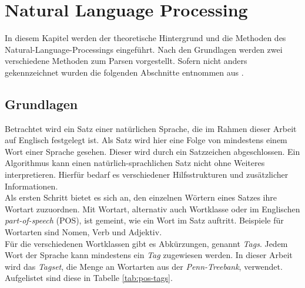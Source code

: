 %
\chapter{Natural Language Processing}
\label{sec:nlp}
In diesem Kapitel werden der theoretische Hintergrund und die Methoden des Natural-Language-Processings eingeführt. Nach den Grundlagen werden zwei verschiedene Methoden zum Parsen vorgestellt. Sofern nicht anders gekennzeichnet wurden die folgenden Abschnitte entnommen aus \cite{nlpGrundlagen}.

\section{Grundlagen}
\label{sec:nlp:grundlagen}

Betrachtet wird ein Satz einer natürlichen Sprache, die im Rahmen dieser Arbeit auf Englisch festgelegt ist. Als Satz wird hier eine Folge von mindestens einem Wort einer Sprache gesehen. Dieser wird durch ein Satzzeichen abgeschlossen.
Ein Algorithmus kann einen natürlich-sprachlichen Satz nicht ohne Weiteres interpretieren. Hierfür bedarf es verschiedener Hilfsstrukturen und zusätzlicher Informationen.\\
Als ersten Schritt bietet es sich an, den einzelnen Wörtern eines Satzes ihre Wortart zuzuordnen. Mit Wortart, alternativ auch Wortklasse oder im Englischen \textit{part-of-speech} (POS), ist gemeint, wie ein Wort im Satz auftritt. Beispiele für Wortarten sind Nomen, Verb und Adjektiv. \\
Für die verschiedenen Wortklassen gibt es Abkürzungen, genannt \textit{Tags}. Jedem Wort der Sprache kann mindestens ein \textit{Tag} zugewiesen werden. In dieser Arbeit wird das \textit{Tagset}, die Menge an Wortarten aus der \textit{Penn-Treebank}, verwendet. Aufgelistet sind diese in Tabelle \ref{tab:pos-tags}. 

